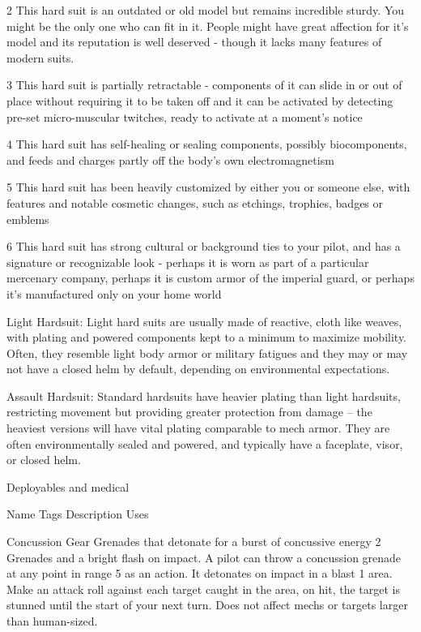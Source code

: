   2      This hard suit is an outdated or old model but remains incredible sturdy. You might be the only one who can
         fit in it. People might have great affection for it’s model and its reputation is well deserved - though it lacks
         many features of modern suits.

  3      This hard suit is partially retractable - components of it can slide in or out of place without requiring it to be
         taken off and it can be activated by detecting pre-set micro-muscular twitches, ready to activate at a
         moment’s notice

  4      This hard suit has self-healing or sealing components, possibly biocomponents, and feeds and charges
         partly off the body’s own electromagnetism

  5      This hard suit has been heavily customized by either you or someone else, with features and notable
         cosmetic changes, such as etchings, trophies, badges or emblems

  6      This hard suit has strong cultural or background ties to your pilot, and has a signature or recognizable look -
         perhaps it is worn as part of a particular mercenary company, perhaps it is custom armor of the imperial
         guard, or perhaps it’s manufactured only on your home world

Light Hardsuit: Light hard suits are usually made of reactive, cloth like weaves, with plating and
powered components kept to a minimum to maximize mobility. Often, they resemble light body
armor or military fatigues and they may or may not have a closed helm by default, depending on
environmental expectations.





Assault Hardsuit: Standard hardsuits have heavier plating than light hardsuits, restricting
movement but providing greater protection from damage -- the heaviest versions will have vital
plating comparable to mech armor. They are often environmentally sealed and powered, and
typically have a faceplate, visor, or closed helm.


                                              Deployables and medical

    Name                   Tags        Description                                                            Uses

    Concussion             Gear        Grenades that detonate for a burst of concussive energy               2
    Grenades                           and a bright flash on impact. A pilot can throw a
                                       concussion grenade at any point in range 5 as an action.
                                       It detonates on impact in a blast 1 area. Make an attack
                                       roll against each target caught in the area, on hit, the
                                       target is stunned until the start of your next turn. Does not
                                       affect mechs or targets larger than human-sized.

